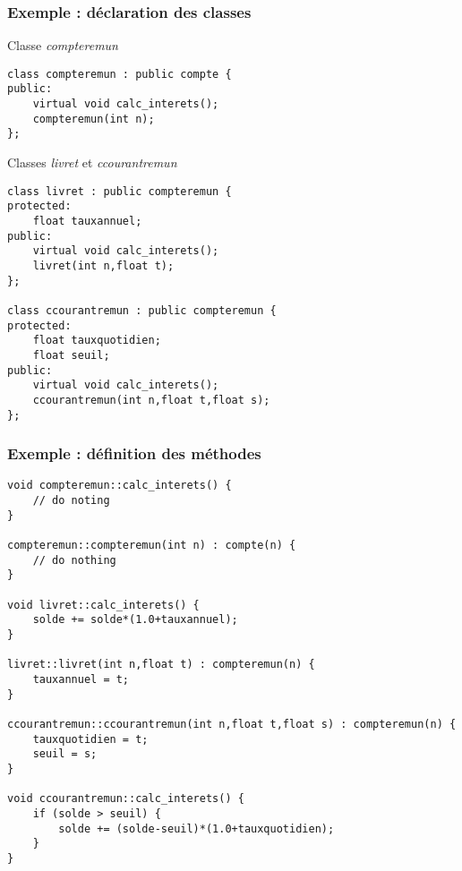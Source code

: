 \begin{frame}[fragile]
\frametitle{Exemple : déclaration des classes}
\begin{codeblock}{Classe \textit{compteremun}}
\begin{lstlisting}
class compteremun : public compte {
public:
    virtual void calc_interets();
    compteremun(int n);
};
\end{lstlisting}
\end{codeblock}

\begin{codeblock}{Classes \textit{livret} et \textit{ccourantremun}}
\begin{lstlisting}
class livret : public compteremun {
protected:
    float tauxannuel;
public:
    virtual void calc_interets();   
    livret(int n,float t);
};

class ccourantremun : public compteremun {
protected:
    float tauxquotidien;
    float seuil;
public:
    virtual void calc_interets();   
    ccourantremun(int n,float t,float s);
};
\end{lstlisting}
\end{codeblock}

\end{frame}

\begin{frame}[fragile]\frametitle{Exemple : définition des méthodes}
\begin{lstlisting}
void compteremun::calc_interets() {
    // do noting
}

compteremun::compteremun(int n) : compte(n) {
    // do nothing
}

void livret::calc_interets() {
    solde += solde*(1.0+tauxannuel);
}

livret::livret(int n,float t) : compteremun(n) {
    tauxannuel = t;
}

ccourantremun::ccourantremun(int n,float t,float s) : compteremun(n) {
    tauxquotidien = t;
    seuil = s;
}

void ccourantremun::calc_interets() {
    if (solde > seuil) {
        solde += (solde-seuil)*(1.0+tauxquotidien);
    }
}
\end{lstlisting}
\end{frame}

